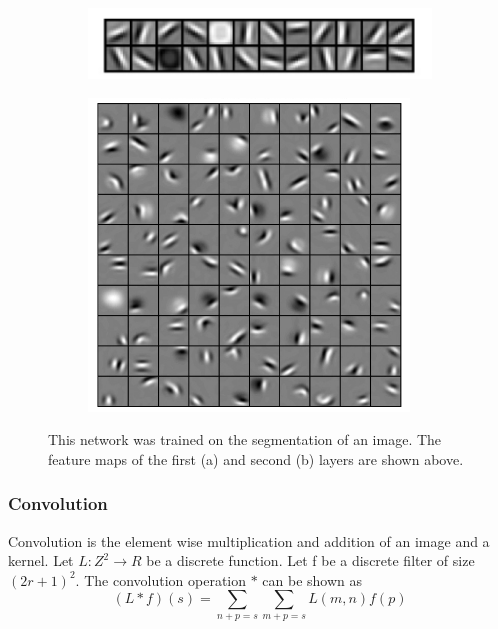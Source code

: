 \begin{figure}
\centering
\begin{subfigure}{.5\textwidth}
  \centering
  \includegraphics[width=.6\linewidth]{first_layer_features.png}
  \caption{}
  \label{fig:first_feature}
\end{subfigure}%
\begin{subfigure}{.5\textwidth}
  \centering
  \includegraphics[width=.6\linewidth]{Second_layer_features.png}
  \caption{}
  \label{fig:second_feature}
\end{subfigure}
\caption{This network was trained on the segmentation of an image. The feature maps of the first (a) and second (b) layers are shown above. }
\label{fig:feature_map}
\end{figure}
    
\subsubsection{Convolution}
    Convolution is the element wise multiplication and addition of an image and a kernel. 
    Let $L:Z^2 \rightarrow R $ be a discrete function. 
    Let f be a discrete filter of size $(2r+1)^2 $. 
    The convolution operation $*$ can be shown as
\begin{equation}
 (L * f)(s) = \sum_{n+p=s}\sum_{m+p=s} L(m,n)f(p)\label{eq:convolution}
\end{equation}
    
